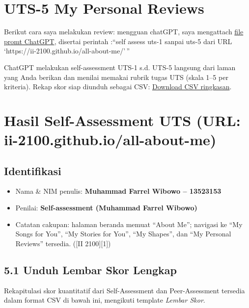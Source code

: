 \documentclass[
  letterpaper,
  DIV=11,
  numbers=noendperiod]{scrreprt}
\providecommand{\tightlist}{%
  \setlength{\itemsep}{0pt}\setlength{\parskip}{0pt}}
\begin{document}

\chapter{UTS-5 My Personal Reviews}\label{uts-5-my-personal-reviews}

Berikut cara saya melakukan review: mengguan chatGPT, saya mengattach
\href{skor_uts.pdf}{file promt ChatGPT}, disertai perintah :``self
assess uts-1 sanpai uts-5 dari URL
`https://ii-2100.github.io/all-about-me/'\,''

ChatGPT melakukan self-assessment UTS-1 s.d. UTS-5 langsung dari laman
yang Anda berikan dan menilai memakai rubrik tugas UTS (skala 1--5 per
kriteria). Rekap skor siap diunduh sebagai CSV:
\href{sandbox:/mnt/data/UTS_self_assessment.csv}{Download CSV
ringkasan}.


\chapter{Hasil Self-Assessment UTS (URL:
ii-2100.github.io/all-about-me)}\label{hasil-self-assessment-uts-url-ii-2100.github.ioall-about-me}

\section{Identifikasi}\label{identifikasi}

\begin{itemize}
\tightlist
\item
  Nama \& NIM penulis: \textbf{Muhammad Farrel Wibowo -- 13523153}
\item
  Penilai: \textbf{Self-assessment (Muhammad Farrel Wibowo)}
\item
  Catatan cakupan: halaman beranda memuat ``About Me''; navigasi ke ``My
  Songs for You'', ``My Stories for You'', ``My Shapes'', dan ``My
  Personal Reviews'' tersedia. ({[}II 2100{]}{[}1{]})
\end{itemize}

\section{5.1 Unduh Lembar Skor Lengkap}\label{unduh-lembar-skor-lengkap}

Rekapitulasi skor kuantitatif dari Self-Assessment dan Peer-Assessment
tersedia dalam format CSV di bawah ini, mengikuti template \emph{Lembar
Skor}.
\end{document}
